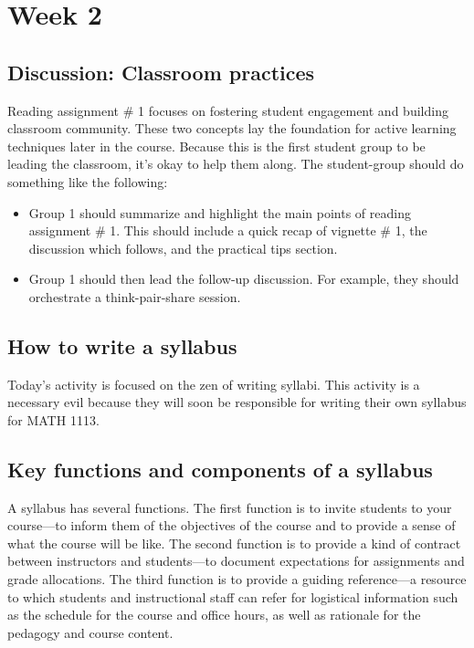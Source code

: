 \section{Week 2}
\label{sec:week-2}

\subsection{Discussion: Classroom practices}
\label{sec:disc-classr-pract}

Reading assignment \# 1 focuses on fostering student engagement and building classroom community.  These two concepts lay the foundation for active learning techniques later in the course.  Because this is the first student group to be leading the classroom, it's okay to help them along.  The student-group should do something like the following:

\begin{itemize}
\item Group 1 should summarize and highlight the main points of reading assignment \# 1.  This should include a quick recap of vignette \# 1, the discussion which follows, and the practical tips section.
\item Group 1 should then lead the follow-up discussion.  For example, they should orchestrate a think-pair-share session.
\end{itemize}

\subsection{How to write a syllabus}
\label{sec:how-write-syllabus}

Today's activity is focused on the zen of writing syllabi.  This activity is a necessary evil because they will soon be responsible for writing their own syllabus for MATH 1113.  

\subsection{Key functions and components of a syllabus}
\label{sec:key-funct-comp}

A syllabus has several functions. The first function is to invite students to your course—to inform them of the objectives of the course and to provide a sense of what the course will be like. The second function is to provide a kind of contract between instructors and students—to document expectations for assignments and grade allocations. The third function is to provide a guiding reference—a resource to which students and instructional staff can refer for logistical information such as the schedule for the course and office hours, as well as rationale for the pedagogy and course content.

